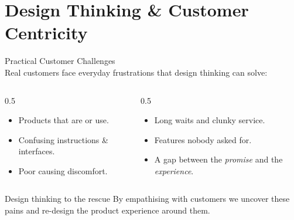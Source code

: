 
\section{Design Thinking \& Customer Centricity}

\begin{frame}{Practical Customer Challenges}
  \accentrule\\[0.3em]
  \small
  Real customers face everyday frustrations that design thinking can solve:
  \begin{columns}[T]
    \begin{column}{0.5\textwidth}
      \begin{itemize}\small
        \item Products that are  or use.
        \item Confusing instructions \& interfaces.
        \item Poor  causing discomfort.
      \end{itemize}
    \end{column}
    \begin{column}{0.5\textwidth}
      \begin{itemize}\small
        \item Long waits and clunky service.
        \item Features nobody asked for.
        \item A gap between the \emph{promise} and the \emph{experience}.
      \end{itemize}
    \end{column}
  \end{columns}
  \vspace{0.4em}
  \begin{block}{Design thinking to the rescue}\scriptsize
    By empathising with customers we uncover these pains and re-design the
    product experience around them.
  \end{block}
\end{frame}

